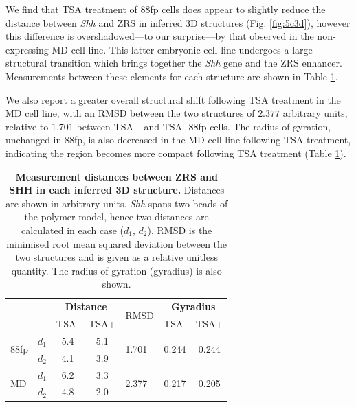 \documentclass[a4paper,11pt,oneside]{book}
\begin{document}
We find that TSA treatment of 88fp cells does appear to slightly reduce the distance between \emph{Shh} and ZRS in inferred 3D structures (Fig. \ref{fig:5c3d}), however this difference is overshadowed---to our surprise---by that observed in the non-expressing MD cell line. This latter embryonic cell line undergoes a large structural transition which brings together the \emph{Shh} gene and the ZRS enhancer. Measurements between these elements for each structure are shown in Table \ref{tab:3ddist}.

We also report a greater overall structural shift following TSA treatment in the MD cell line, with an RMSD between the two structures of $2.377$ arbitrary units, relative to $1.701$ between TSA+ and TSA- 88fp cells. The radius of gyration, unchanged in 88fp, is also decreased in the MD cell line following TSA treatment, indicating the region becomes more compact following TSA treatment (Table \ref{tab:3ddist}).

\begin{table}[]
\centering
\caption[Measurement distances between ZRS and SHH in each inferred 3D structure.]{ {\bf Measurement distances between ZRS and SHH in each inferred 3D structure. }
Distances are shown in arbitrary units. \emph{Shh} spans two beads of the polymer model, hence two distances are calculated in each case ($d_1$, $d_2$). RMSD is the minimised root mean squared deviation between the two structures and is given as a relative unitless quantity. The radius of gyration (gyradius) is also shown.
}
\label{tab:3ddist}
\begin{tabular}{ll|cc|l|cc|}
                      &    & \multicolumn{2}{c|}{{\bf Distance}} & \multirow{2}{*}{RMSD}   & \multicolumn{2}{c|}{{\bf Gyradius}}             \\
                      &    & TSA-             & TSA+             &                        & TSA-                   & TSA+                   \\ \hline
\multirow{2}{*}{88fp} & $d_1$ & 5.4              & 5.1              & \multirow{2}{*}{1.701} & \multirow{2}{*}{0.244} & \multirow{2}{*}{0.244} \\
                      & $d_2$ & 4.1              & 3.9              &                        &                        &                        \\ \hline
\multirow{2}{*}{MD}   & $d_1$ & 6.2              & 3.3              & \multirow{2}{*}{2.377} & \multirow{2}{*}{0.217} & \multirow{2}{*}{0.205} \\
                      & $d_2$ & 4.8              & 2.0              &                        &                        &                        \\ \hline
\end{tabular}
\end{table}
\end{document}
